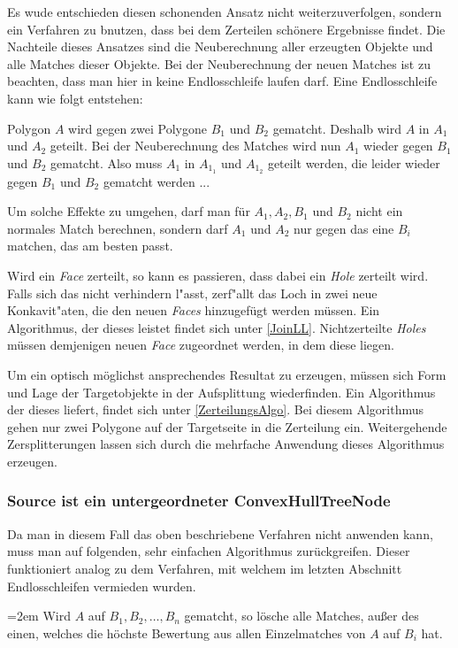 Es wude entschieden diesen schonenden Ansatz nicht weiterzuverfolgen, sondern ein Verfahren zu bnutzen, dass bei dem Zerteilen schönere Ergebnisse findet. Die Nachteile dieses Ansatzes sind die Neuberechnung aller erzeugten Objekte und alle Matches dieser Objekte. Bei der Neuberechnung der neuen Matches ist zu beachten, dass man hier in keine Endlosschleife laufen darf. Eine Endlosschleife kann wie folgt entstehen:

Polygon $A$ wird gegen zwei Polygone $B_1$ und $B_2$ gematcht. Deshalb wird $A$ in $A_1$ und $A_2$ geteilt. Bei der Neuberechnung des Matches wird nun $A_1$ wieder gegen $B_1$  und $B_2$ gematcht. Also muss $A_1$ in $A_{1_1}$ und $A_{1_2}$ geteilt werden, die leider wieder gegen $B_1$ und $B_2$ gematcht werden ...

Um solche Effekte zu umgehen, darf man für $A_1, A_2,B_1$ und $B_2$ nicht ein normales Match berechnen, sondern darf $A_1$ und $A_2$ nur gegen das eine $B_i$ matchen, das am besten passt. 

Wird ein \textit{Face} zerteilt, so kann es passieren, dass dabei ein \textit{Hole} zerteilt wird. Falls sich das nicht verhindern l"asst, zerf"allt das Loch in zwei neue Konkavit"aten, die den neuen \textit{Faces} hinzugefügt werden müssen. Ein Algorithmus, der dieses leistet findet sich unter \vref{JoinLL}. Nichtzerteilte \textit{Holes} müssen demjenigen neuen \textit{Face} zugeordnet werden, in dem diese liegen.

Um ein optisch möglichst ansprechendes Resultat zu erzeugen, müssen sich Form und Lage der Targetobjekte in der Aufsplittung wiederfinden. Ein Algorithmus der dieses liefert, findet sich unter \vref{ZerteilungsAlgo}. Bei diesem Algorithmus gehen nur zwei Polygone auf der Targetseite in die Zerteilung ein. Weitergehende Zersplitterungen lassen sich durch die mehrfache Anwendung dieses Algorithmus erzeugen.

\subsubsection*{Source ist ein untergeordneter ConvexHullTreeNode}

Da man in diesem Fall das oben beschriebene Verfahren nicht anwenden kann, muss man auf folgenden, sehr einfachen Algorithmus zurückgreifen. Dieser  funktioniert analog zu dem Verfahren, mit welchem im letzten Abschnitt Endlosschleifen vermieden wurden.

\par
\begingroup
\leftskip=2em 
Wird $A$ auf  $B_1,B_2, \hdots ,B_n$ gematcht, so lösche alle Matches, außer des einen, welches die höchste Bewertung aus allen Einzelmatches von $A$ auf $B_i$ hat.
\par
\endgroup


